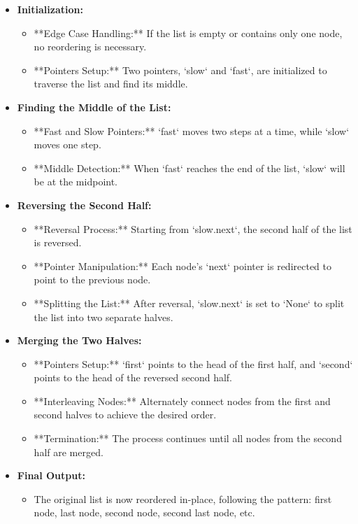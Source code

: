 \begin{itemize}
    \item \textbf{Initialization:}
    \begin{itemize}
        \item **Edge Case Handling:** If the list is empty or contains only one node, no reordering is necessary.
        \item **Pointers Setup:** Two pointers, `slow` and `fast`, are initialized to traverse the list and find its middle.
    \end{itemize}
    
    \item \textbf{Finding the Middle of the List:}
    \begin{itemize}
        \item **Fast and Slow Pointers:** `fast` moves two steps at a time, while `slow` moves one step.
        \item **Middle Detection:** When `fast` reaches the end of the list, `slow` will be at the midpoint.
    \end{itemize}
    
    \item \textbf{Reversing the Second Half:}
    \begin{itemize}
        \item **Reversal Process:** Starting from `slow.next`, the second half of the list is reversed.
        \item **Pointer Manipulation:** Each node's `next` pointer is redirected to point to the previous node.
        \item **Splitting the List:** After reversal, `slow.next` is set to `None` to split the list into two separate halves.
    \end{itemize}
    
    \item \textbf{Merging the Two Halves:}
    \begin{itemize}
        \item **Pointers Setup:** `first` points to the head of the first half, and `second` points to the head of the reversed second half.
        \item **Interleaving Nodes:** Alternately connect nodes from the first and second halves to achieve the desired order.
        \item **Termination:** The process continues until all nodes from the second half are merged.
    \end{itemize}
    
    \item \textbf{Final Output:}
    \begin{itemize}
        \item The original list is now reordered in-place, following the pattern: first node, last node, second node, second last node, etc.
    \end{itemize}
\end{itemize}

